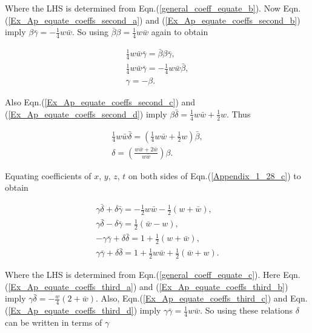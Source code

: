 \begin{appendix}
\noindent Where the LHS is determined from Eqn.(\ref{general_coeff_equate_b}). Now Eqn.(\ref{Ex_Ap_equate_coeffs_second_a}) and (\ref{Ex_Ap_equate_coeffs_second_b}) imply $\beta \bar{\gamma} = -\frac{1}{4}w\bar{w}$. So using $\bar{\beta} \beta= \frac{1}{4}w\bar{w}$ again to obtain

\begin{gather*}
\frac{1}{4}w\bar{w} \bar{\gamma} = \bar{\beta}\beta\bar{\gamma},\\
\frac{1}{4}w\bar{w} \bar{\gamma} = -\frac{1}{4}w\bar{w} \bar{\beta},\\
\gamma = -\beta.
\end{gather*}

\noindent Also Eqn.(\ref{Ex_Ap_equate_coeffs_second_c}) and (\ref{Ex_Ap_equate_coeffs_second_d}) imply $\beta \bar{\delta} = \frac{1}{4}w\bar{w} + \frac{1}{2}w$. Thus

\begin{gather*}
\frac{1}{4}w\bar{w}\bar{\delta} = \left(\frac{1}{4}w\bar{w}+ \frac{1}{2}w\right)\bar{\beta},\\
\delta = \left(\frac{w\bar{w} + 2\bar{w}}{w\bar{w}}\right)\beta.
\end{gather*}

\noindent Equating coefficients of $x$, $y$, $z$, $t$ on both sides of Eqn.(\ref{Appendix_1_28_c}) to obtain

\begin{subequations}
\begin{gather}\label{Ex_Ap_equate_coeffs_third_a}
\gamma \bar{\delta} + \delta \bar{\gamma} = -\frac{1}{2}w\bar{w} - \frac{1}{2}(w + \bar{w}), \\\label{Ex_Ap_equate_coeffs_third_b}
\gamma \bar{\delta} - \delta \bar{\gamma} =  \frac{1}{2}(\bar{w}-w),\\\label{Ex_Ap_equate_coeffs_third_c}
-\gamma \bar{\gamma} + \delta \bar{\delta} = 1 + \frac{1}{2}(w + \bar{w}),\\\label{Ex_Ap_equate_coeffs_third_d}
\gamma \bar{\gamma} + \delta \bar{\delta} = 1 + \frac{1}{2}w\bar{w} + \frac{1}{2}(\bar{w}+w). 
\end{gather}
\end{subequations}

\noindent Where the LHS is determined from Eqn.(\ref{general_coeff_equate_c}). Here Eqn.(\ref{Ex_Ap_equate_coeffs_third_a}) and (\ref{Ex_Ap_equate_coeffs_third_b}) imply $\gamma \bar{\delta} = -\frac{w}{4}(2+\bar{w})$. Also, Eqn.(\ref{Ex_Ap_equate_coeffs_third_c}) and Eqn.(\ref{Ex_Ap_equate_coeffs_third_d}) imply $\gamma \bar{\gamma} = \frac{1}{4}w\bar{w}$. So using these relations $\delta$ can be written in terms of $\gamma$ 


\end{appendix}
